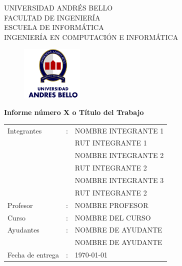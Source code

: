 \documentclass[letterpaper,12pt]{report}
\begin{document}
\renewcommand{\contentsname}{Tabla de Contenido}
\begin{titlepage}
\begin{center}
UNIVERSIDAD ANDRÉS BELLO\\
FACULTAD DE INGENIERÍA\\
ESCUELA DE INFORMÁTICA\\
INGENIERÍA EN COMPUTACIÓN E INFORMÁTICA
\begin{figure}[htb]
\begin{center}
	\includegraphics[width=2.97cm,bb=0 0 836 732]{color-836x732.png}
\end{center}
\end{figure}

\vspace*{0.5in}
\begin{Large}
\textbf{Informe número X o Título del Trabajo} \\
\end{Large}
\vspace*{0.3in}

\vspace*{2in}

\end{center}
\begin{flushright}

\begin{tabular}{lll}
Integrantes & : & NOMBRE INTEGRANTE 1\\
            &   & RUT INTEGRANTE 1\\
            &  & NOMBRE INTEGRANTE 2\\
            &   & RUT INTEGRANTE 2\\
            &  & NOMBRE INTEGRANTE 3\\
            &   & RUT INTEGRANTE 2\\
Profesor & : & NOMBRE PROFESOR\\
Curso & : & NOMBRE DEL CURSO\\
Ayudantes & : & NOMBRE DE AYUDANTE\\
 &  & NOMBRE DE AYUDANTE\\
Fecha de entrega & : & \today
\end{tabular}
\end{flushright}
\end{titlepage}
\end{document}
